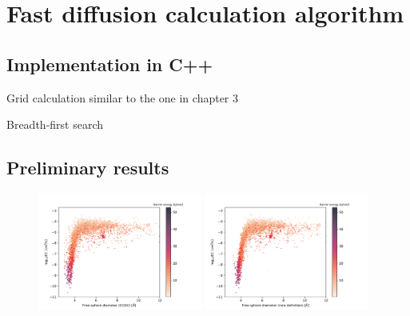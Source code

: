 \documentclass[main]{subfiles}
\begin{document}
\section{Fast diffusion calculation algorithm}\label{sct:algo_diff}

\subsection{Implementation in C++}

Grid calculation similar to the one in chapter 3

Breadth-first search

\subsection{Preliminary results}


\begin{figure}[ht]
  \centering
    \includegraphics[width=0.48\textwidth]{figures/5-diffusion/difflog_Df-ccdc_barrier.pdf}
    \includegraphics[width=0.48\textwidth]{figures/5-diffusion/difflog_Df-uff298K_barrier.pdf}
    \caption{}\label{fgr:diff_pld_barrier}
\end{figure}
\end{document}
